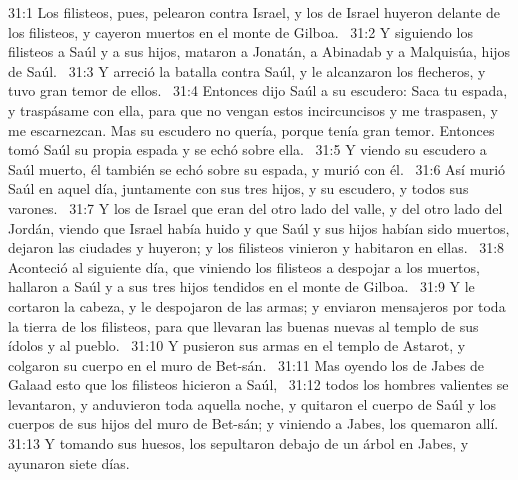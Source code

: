 31:1 Los filisteos, pues, pelearon contra Israel, y los de Israel huyeron delante de los filisteos, y cayeron muertos en el monte de Gilboa.  
31:2 Y siguiendo los filisteos a Saúl y a sus hijos, mataron a Jonatán, a Abinadab y a Malquisúa, hijos de Saúl.  
31:3 Y arreció la batalla contra Saúl, y le alcanzaron los flecheros, y tuvo gran temor de ellos.  
31:4 Entonces dijo Saúl a su escudero: Saca tu espada, y traspásame con ella, para que no vengan estos incircuncisos y me traspasen, y me escarnezcan. Mas su escudero no quería, porque tenía gran temor. Entonces tomó Saúl su propia espada y se echó sobre ella.  
31:5 Y viendo su escudero a Saúl muerto, él también se echó sobre su espada, y murió con él.  
31:6 Así murió Saúl en aquel día, juntamente con sus tres hijos, y su escudero, y todos sus varones.  
31:7 Y los de Israel que eran del otro lado del valle, y del otro lado del Jordán, viendo que Israel había huido y que Saúl y sus hijos habían sido muertos, dejaron las ciudades y huyeron; y los filisteos vinieron y habitaron en ellas.  
31:8 Aconteció al siguiente día, que viniendo los filisteos a despojar a los muertos, hallaron a Saúl y a sus tres hijos tendidos en el monte de Gilboa.  
31:9 Y le cortaron la cabeza, y le despojaron de las armas; y enviaron mensajeros por toda la tierra de los filisteos, para que llevaran las buenas nuevas al templo de sus ídolos y al pueblo.  
31:10 Y pusieron sus armas en el templo de Astarot, y colgaron su cuerpo en el muro de Bet-sán.  
31:11 Mas oyendo los de Jabes de Galaad esto que los filisteos hicieron a Saúl,  
31:12 todos los hombres valientes se levantaron, y anduvieron toda aquella noche, y quitaron el cuerpo de Saúl y los cuerpos de sus hijos del muro de Bet-sán; y viniendo a Jabes, los quemaron allí.  
31:13 Y tomando sus huesos, los sepultaron debajo de un árbol en Jabes, y ayunaron siete días.